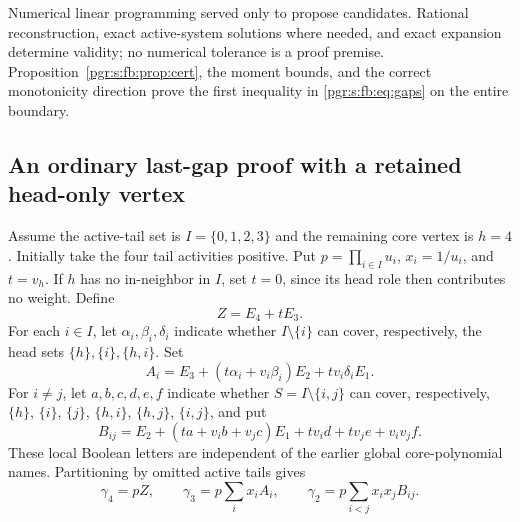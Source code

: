 \documentclass[11pt]{article}
\numberwithin{equation}{section}
\theoremstyle{definition}\newtheorem{definition}[theorem]{Definition}\newtheorem{remark}[theorem]{Remark}
\begin{document}
Numerical linear programming served only to propose candidates. Rational reconstruction, exact active-system solutions where needed, and exact expansion determine validity; no numerical tolerance is a proof premise. Proposition~\ref{pgr:s:fb:prop:cert}, the moment bounds, and the correct monotonicity direction prove the first inequality in \eqref{pgr:s:fb:eq:gaps} on the entire boundary.

\subsection{An ordinary last-gap proof with a retained head-only vertex}
Assume the active-tail set is $I=\{0,1,2,3\}$ and the remaining core vertex is $h=4$. Initially take the four tail activities positive. Put $p=\prod_{i\in I}u_i$, $x_i=1/u_i$, and $t=v_h$. If $h$ has no in-neighbor in $I$, set $t=0$, since its head role then contributes no weight. Define
\[
 Z=E_4+tE_3.
\]
For each $i\in I$, let $\alpha_i,\beta_i,\delta_i$ indicate whether $I\setminus\{i\}$ can cover, respectively, the head sets $\{h\},\{i\},\{h,i\}$. Set
\[
 A_i=E_3+(t\alpha_i+v_i\beta_i)E_2+tv_i\delta_iE_1.
\]
For $i\ne j$, let $a,b,c,d,e,f$ indicate whether $S=I\setminus\{i,j\}$ can cover, respectively,
$\{h\}$, $\{i\}$, $\{j\}$, $\{h,i\}$, $\{h,j\}$, $\{i,j\}$, and put
\[
 B_{ij}=E_2+(ta+v_ib+v_jc)E_1+tv_id+tv_je+v_iv_jf.
\]
These local Boolean letters are independent of the earlier global core-polynomial names. Partitioning by omitted active tails gives
\begin{equation}\label{pgr:s:fb:eq:reciprocal}
 \gamma_4=pZ,\qquad \gamma_3=p\sum_i x_iA_i,
 \qquad \gamma_2=p\sum_{i<j}x_ix_jB_{ij}.
\end{equation}
\end{document}
